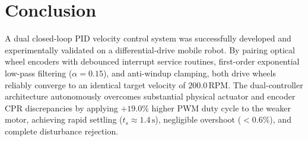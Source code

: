 \documentclass[11pt,a4paper]{article}
\begin{document}
\vspace{-0.22cm}
\section{Conclusion}
A dual closed-loop PID velocity control system was successfully developed and experimentally validated on a differential-drive mobile robot. By pairing optical wheel encoders with debounced interrupt service routines, first-order exponential low-pass filtering ($\alpha = 0.15$), and anti-windup clamping, both drive wheels reliably converge to an identical target velocity of $200.0\,\text{RPM}$. The dual-controller architecture autonomously overcomes substantial physical actuator and encoder CPR discrepancies by applying $+19.0\%$ higher PWM duty cycle to the weaker motor, achieving rapid settling ($t_s \approx 1.4\,\text{s}$), negligible overshoot ($< 0.6\%$), and complete disturbance rejection.
\end{document}
